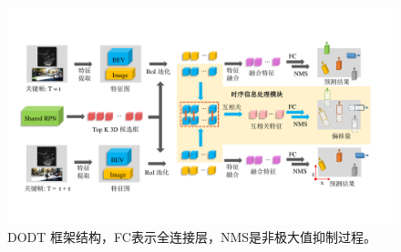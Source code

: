 \begin{figure}[h]
	\begin{center}
		\includegraphics[trim={1.1cm, 2.5cm, 1.5cm, 2.5cm}, clip, width=\textwidth]{imgs/structure_final.pdf}
	\end{center}
	\vspace{-0.8cm}
	\caption{DODT 框架结构，FC表示全连接层，NMS是非极大值抑制过程。}
	\label{fig:dodt}
\end{figure}
